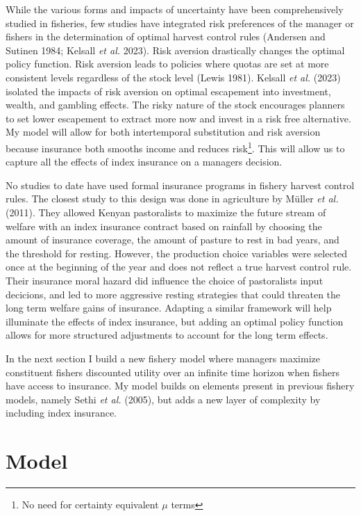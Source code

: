 \documentclass[
  letterpaper,
  DIV=11,
  numbers=noendperiod]{scrartcl}
\begin{document}
While the various forms and impacts of uncertainty have been
comprehensively studied in fisheries, few studies have integrated risk
preferences of the manager or fishers in the determination of optimal
harvest control rules (Andersen and Sutinen 1984; Kelsall \emph{et al.}
2023). Risk aversion drastically changes the optimal policy function.
Risk aversion leads to policies where quotas are set at more consistent
levels regardless of the stock level (Lewis 1981). Kelsall \emph{et al.}
(2023) isolated the impacts of risk aversion on optimal escapement into
investment, wealth, and gambling effects. The risky nature of the stock
encourages planners to set lower escapement to extract more now and
invest in a risk free alternative. My model will allow for both
intertemporal substitution and risk aversion because insurance both
smooths income and reduces risk\footnote{No need for certainty
  equivalent \(\mu\) terms}. This will allow us to capture all the
effects of index insurance on a managers decision.

No studies to date have used formal insurance programs in fishery
harvest control rules. The closest study to this design was done in
agriculture by Müller \emph{et al.} (2011). They allowed Kenyan
pastoralists to maximize the future stream of welfare with an index
insurance contract based on rainfall by choosing the amount of insurance
coverage, the amount of pasture to rest in bad years, and the threshold
for resting. However, the production choice variables were selected once
at the beginning of the year and does not reflect a true harvest control
rule. Their insurance moral hazard did influence the choice of
pastoralists input decicions, and led to more aggressive resting
strategies that could threaten the long term welfare gains of insurance.
Adapting a similar framework will help illuminate the effects of index
insurance, but adding an optimal policy function allows for more
structured adjustments to account for the long term effects.

In the next section I build a new fishery model where managers maximize
constituent fishers discounted utility over an infinite time horizon
when fishers have access to insurance. My model builds on elements
present in previous fishery models, namely Sethi \emph{et al.} (2005),
but adds a new layer of complexity by including index insurance.

\hypertarget{sec-num}{%
\section{Model}\label{sec-num}}
\end{document}
